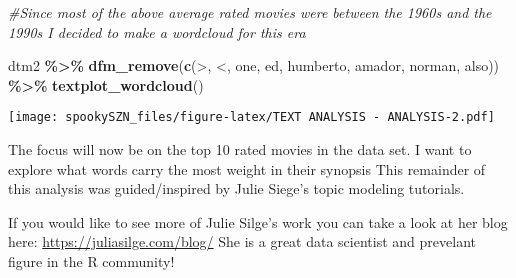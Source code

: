 \documentclass[
]{article}
\newenvironment{Shaded}{\begin{snugshade}}{\end{snugshade}}
\newcommand{\CommentTok}[1]{\textcolor[rgb]{0.56,0.35,0.01}{\textit{#1}}}
\newcommand{\FunctionTok}[1]{\textcolor[rgb]{0.13,0.29,0.53}{\textbf{#1}}}
\newcommand{\NormalTok}[1]{#1}
\newcommand{\SpecialCharTok}[1]{\textcolor[rgb]{0.81,0.36,0.00}{\textbf{#1}}}
\newcommand{\StringTok}[1]{\textcolor[rgb]{0.31,0.60,0.02}{#1}}
\begin{document}
\begin{Shaded}
\begin{Highlighting}[]
\CommentTok{\#Since most of the above average rated movies were between the 1960\textquotesingle{}s and the 1990\textquotesingle{}s I decided to make a wordcloud for this era}

\NormalTok{dtm2 }\SpecialCharTok{\%\textgreater{}\%}   
  \FunctionTok{dfm\_remove}\NormalTok{(}\FunctionTok{c}\NormalTok{(}\StringTok{\textquotesingle{}\textgreater{}\textquotesingle{}}\NormalTok{, }\StringTok{\textquotesingle{}\textless{}\textquotesingle{}}\NormalTok{, }\StringTok{\textquotesingle{}one\textquotesingle{}}\NormalTok{, }\StringTok{\textquotesingle{}ed\textquotesingle{}}\NormalTok{, }\StringTok{\textquotesingle{}humberto\textquotesingle{}}\NormalTok{, }\StringTok{\textquotesingle{}amador\textquotesingle{}}\NormalTok{, }\StringTok{\textquotesingle{}norman\textquotesingle{}}\NormalTok{, }\StringTok{\textquotesingle{}also\textquotesingle{}}\NormalTok{)) }\SpecialCharTok{\%\textgreater{}\%}
  \FunctionTok{textplot\_wordcloud}\NormalTok{() }
\end{Highlighting}
\end{Shaded}

\texttt{[image: spookySZN\_files/figure-latex/TEXT ANALYSIS - ANALYSIS-2.pdf]}

The focus will now be on the top 10 rated movies in the data set. I want
to explore what words carry the most weight in their synopsis This
remainder of this analysis was guided/inspired by Julie Siege's topic
modeling tutorials.

If you would like to see more of Julie Silge's work you can take a look
at her blog here: \url{https://juliasilge.com/blog/} She is a great data
scientist and prevelant figure in the R community!
\end{document}
